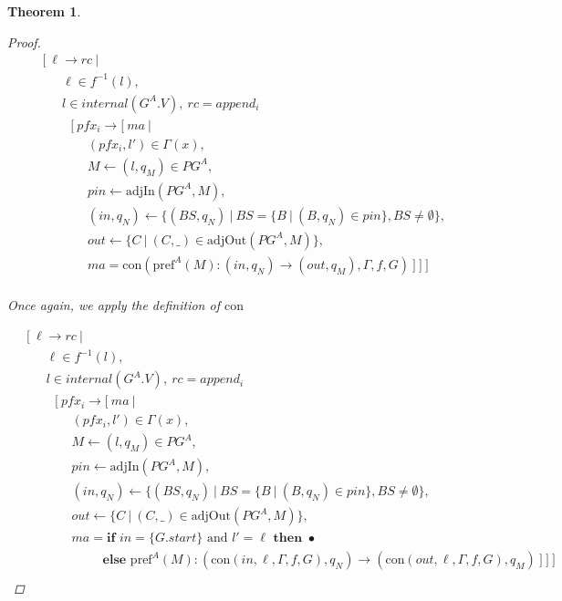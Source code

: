 \documentclass[twocolumn, openany]{sig-alternate-10pt}
\newcommand{\Con}{\mathrm{con}}
\newcommand{\Pref}{\ensuremath{\mathrm{pref}}}
\newtheorem{thm}{Theorem}
\begin{document}
\begin{thm}
\begin{proof}
  \[ \begin{array}{l}
     ~~~~~ [~ \ell \rightarrow rc ~\vert~ \\
     ~~~~~~~~~~~~ \ell \in f^{-1}(l), \\
     ~~~~~~~~~~~~ l \in internal(G^A.V), ~rc = append_i \\
     ~~~~~~~~~~~~~~~ [~ pfx_i \rightarrow [~ ma ~\vert~ \\
     ~~~~~~~~~~~~~~~~~~~~~ (pfx_i, l') \in \Gamma(x), \\
     ~~~~~~~~~~~~~~~~~~~~~ M \leftarrow (l,q_M) \in PG^A, \\
     ~~~~~~~~~~~~~~~~~~~~~ pin \leftarrow \text{adjIn}(PG^A,M), \\
     ~~~~~~~~~~~~~~~~~~~~~ (in,q_N) \leftarrow \{ (BS,q_N) ~\vert~ BS=\{B ~\vert~ (B,q_N) \in pin \}, BS \neq \emptyset \}, \\
     ~~~~~~~~~~~~~~~~~~~~~ out \leftarrow \{ C ~\vert~ (C,\_) \in \text{adjOut}(PG^A,M) \}, \\
     ~~~~~~~~~~~~~~~~~~~~~ ma = \Con(\Pref^A(M) : (in,q_N) \rightarrow (out,q_M), \Gamma, f, G) ~] ~] ~] \\
  \end{array} \]%

  \noindent
  Once again, we apply the definition of $\Con$

  \[ \begin{array}{l}
     ~~~~~ [~ \ell \rightarrow rc ~\vert~ \\
     ~~~~~~~~~~~~ \ell \in f^{-1}(l), \\
     ~~~~~~~~~~~~ l \in internal(G^A.V), ~rc = append_i \\
     ~~~~~~~~~~~~~~~ [~ pfx_i \rightarrow [~ ma ~\vert~ \\
     ~~~~~~~~~~~~~~~~~~~~~ (pfx_i, l') \in \Gamma(x), \\
     ~~~~~~~~~~~~~~~~~~~~~ M \leftarrow (l,q_M) \in PG^A, \\
     ~~~~~~~~~~~~~~~~~~~~~ pin \leftarrow \text{adjIn}(PG^A,M), \\
     ~~~~~~~~~~~~~~~~~~~~~ (in,q_N) \leftarrow \{ (BS,q_N) ~\vert~ BS=\{B ~\vert~ (B,q_N) \in pin \}, BS \neq \emptyset \}, \\
     ~~~~~~~~~~~~~~~~~~~~~ out \leftarrow \{ C ~\vert~ (C,\_) \in \text{adjOut}(PG^A,M) \}, \\
     ~~~~~~~~~~~~~~~~~~~~~ ma = \textbf{if } in = \{ G.start \} \text{ and } l'=\ell \textbf{ then } \bullet \\
     ~~~~~~~~~~~~~~~~~~~~~~~~~~~~~~~~ \textbf{else } \Pref^A(M) : (\Con(in, \ell, \Gamma, f, G),q_N) \rightarrow (\Con(out, \ell, \Gamma, f, G), q_M) ~] ~] ~]\\
  \end{array} \]%


\end{proof}
\end{thm}
\end{document}
